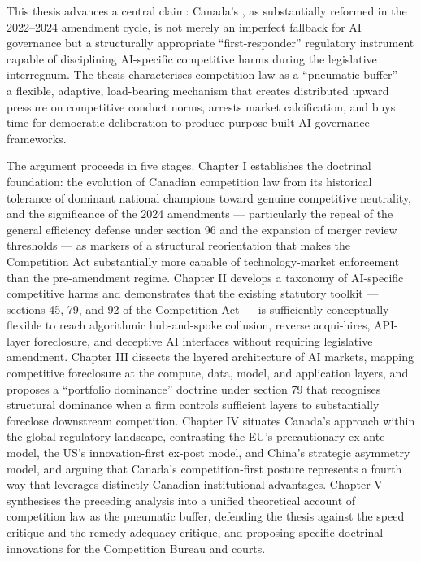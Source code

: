 This thesis advances a central claim: Canada's , as substantially reformed in the 2022--2024 amendment cycle, is not merely an imperfect fallback for AI governance but a structurally appropriate ``first-responder'' regulatory instrument capable of disciplining AI-specific competitive harms during the legislative interregnum. The thesis characterises competition law as a ``pneumatic buffer'' --- a flexible, adaptive, load-bearing mechanism that creates distributed upward pressure on competitive conduct norms, arrests market calcification, and buys time for democratic deliberation to produce purpose-built AI governance frameworks.

The argument proceeds in five stages. Chapter I establishes the doctrinal foundation: the evolution of Canadian competition law from its historical tolerance of dominant national champions toward genuine competitive neutrality, and the significance of the 2024 amendments --- particularly the repeal of the general efficiency defense under section 96 and the expansion of merger review thresholds --- as markers of a structural reorientation that makes the Competition Act substantially more capable of technology-market enforcement than the pre-amendment regime. Chapter II develops a taxonomy of AI-specific competitive harms and demonstrates that the existing statutory toolkit --- sections 45, 79, and 92 of the Competition Act --- is sufficiently conceptually flexible to reach algorithmic hub-and-spoke collusion, reverse acqui-hires, API-layer foreclosure, and deceptive AI interfaces without requiring legislative amendment. Chapter III dissects the layered architecture of AI markets, mapping competitive foreclosure at the compute, data, model, and application layers, and proposes a ``portfolio dominance'' doctrine under section 79 that recognises structural dominance when a firm controls sufficient layers to substantially foreclose downstream competition. Chapter IV situates Canada's approach within the global regulatory landscape, contrasting the EU's precautionary ex-ante model, the US's innovation-first ex-post model, and China's strategic asymmetry model, and arguing that Canada's competition-first posture represents a fourth way that leverages distinctly Canadian institutional advantages. Chapter V synthesises the preceding analysis into a unified theoretical account of competition law as the pneumatic buffer, defending the thesis against the speed critique and the remedy-adequacy critique, and proposing specific doctrinal innovations for the Competition Bureau and courts.

